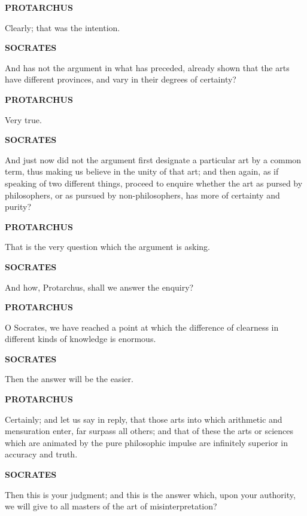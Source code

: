 \documentclass[11pt,letter]{article}
\begin{document}
\par \textbf{PROTARCHUS}
\par   Clearly; that was the intention.

\par \textbf{SOCRATES}
\par   And has not the argument in what has preceded, already shown that the arts have different provinces, and vary in their degrees of certainty?

\par \textbf{PROTARCHUS}
\par   Very true.

\par \textbf{SOCRATES}
\par   And just now did not the argument first designate a particular art by a common term, thus making us believe in the unity of that art; and then again, as if speaking of two different things, proceed to enquire whether the art as pursed by philosophers, or as pursued by non-philosophers, has more of certainty and purity?

\par \textbf{PROTARCHUS}
\par   That is the very question which the argument is asking.

\par \textbf{SOCRATES}
\par   And how, Protarchus, shall we answer the enquiry?

\par \textbf{PROTARCHUS}
\par   O Socrates, we have reached a point at which the difference of clearness in different kinds of knowledge is enormous.

\par \textbf{SOCRATES}
\par   Then the answer will be the easier.

\par \textbf{PROTARCHUS}
\par   Certainly; and let us say in reply, that those arts into which arithmetic and mensuration enter, far surpass all others; and that of these the arts or sciences which are animated by the pure philosophic impulse are infinitely superior in accuracy and truth.

\par \textbf{SOCRATES}
\par   Then this is your judgment; and this is the answer which, upon your authority, we will give to all masters of the art of misinterpretation?
\end{document}

